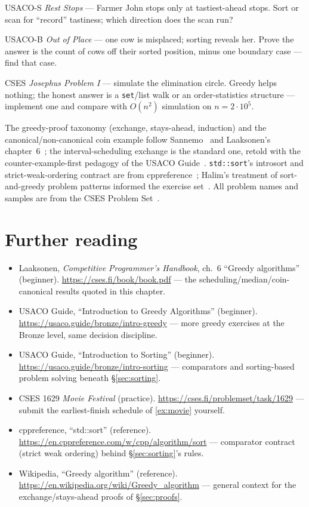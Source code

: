 \begin{exercise}[medium] USACO-S \emph{Rest Stops} --- Farmer John stops
only at tastiest-ahead stops. Sort or scan for ``record'' tastiness;
which direction does the scan run?
\end{exercise}
\begin{exercise}[medium] USACO-B \emph{Out of Place} --- one cow is
misplaced; sorting reveals her. Prove the answer is the count of cows
off their sorted position, minus one boundary case --- find that case.
\end{exercise}
\begin{exercise}[hard] CSES \emph{Josephus Problem I} --- simulate the
elimination circle. Greedy helps nothing; the honest answer is a
\texttt{set}/list walk or an order-statistics structure --- implement one
and compare with $O(n^2)$ simulation on $n=2\cdot10^5$.
\end{exercise}

\chapternotes
The greedy-proof taxonomy (exchange, stays-ahead, induction) and the
canonical/non-canonical coin example follow
Sannemo~\cite{sannemo2025} and Laaksonen's chapter~6~\cite{laaksonen2024};
the interval-scheduling exchange is the standard one, retold with the
counter-example-first pedagogy of the USACO Guide~\cite{usacoguide}.
\texttt{std::sort}'s introsort and strict-weak-ordering contract are
from cppreference~\cite{cppreference}; Halim's treatment of sort-and-greedy
problem patterns informed the exercise set~\cite{halimcp4}. All problem
names and samples are from the CSES Problem Set~\cite{cses}.

\section*{Further reading}
\begin{itemize}
\item Laaksonen, \emph{Competitive Programmer's Handbook}, ch.~6 ``Greedy
algorithms'' (beginner). \url{https://cses.fi/book/book.pdf} --- the
scheduling/median/coin-canonical results quoted in this chapter.
\item USACO Guide, ``Introduction to Greedy Algorithms'' (beginner).
\url{https://usaco.guide/bronze/intro-greedy} --- more greedy exercises at
the Bronze level, same decision discipline.
\item USACO Guide, ``Introduction to Sorting'' (beginner).
\url{https://usaco.guide/bronze/intro-sorting} --- comparators and
sorting-based problem solving beneath \S\ref{sec:sorting}.
\item CSES 1629 \emph{Movie Festival} (practice).
\url{https://cses.fi/problemset/task/1629} --- submit the earliest-finish
schedule of \ref{ex:movie} yourself.
\item cppreference, ``std::sort'' (reference).
\url{https://en.cppreference.com/w/cpp/algorithm/sort} --- comparator
contract (strict weak ordering) behind \S\ref{sec:sorting}'s rules.
\item Wikipedia, ``Greedy algorithm'' (reference).
\url{https://en.wikipedia.org/wiki/Greedy_algorithm} --- general context
for the exchange/stays-ahead proofs of \S\ref{sec:proofs}.
\end{itemize}

